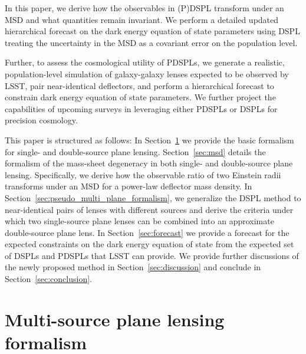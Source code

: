 \documentclass[a4paper,11pt]{article}
\begin{document}
In this paper, we derive how the observables in (P)DSPL transform under an MSD and what quantities remain invariant. We perform a detailed updated hierarchical forecast on the dark energy equation of state parameters using DSPL treating the uncertainty in the MSD as a covariant error on the population level.

Further, to assess the cosmological utility of PDSPLs, we generate a realistic, population-level simulation of galaxy-galaxy lenses expected to be observed by LSST, pair near-identical deflectors, and perform a hierarchical forecast to constrain dark energy equation of state parameters. We further project the capabilities of upcoming surveys in leveraging either PDSPLs or DSPLs for precision cosmology.






This paper is structured as follows: In Section~\ref{sec:multi_source_plane} we provide the basic formalism for single- and double-source plane lensing. Section~\ref{sec:msd} details the formalism of the mass-sheet degeneracy in both single- and double-source plane lensing. Specifically, we derive how the observable ratio of two Einstein radii transforms under an MSD for a power-law deflector mass density. In Section~\ref{sec:pseudo_multi_plane_formalism}, we generalize the DSPL method to near-identical pairs of lenses with different sources and derive the criteria under which two single-source plane lenses can be combined into an approximate double-source plane lens. In Section~\ref{sec:forecast} we provide a forecast for the expected constraints on the dark energy equation of state from the expected set of DSPLs and PDSPLs that LSST can provide. 
We provide further discussions of the newly proposed method in Section~\ref{sec:discussion} and conclude in Section~\ref{sec:conclusion}.

\section{Multi-source plane lensing formalism}\label{sec:multi_source_plane}
\end{document}
